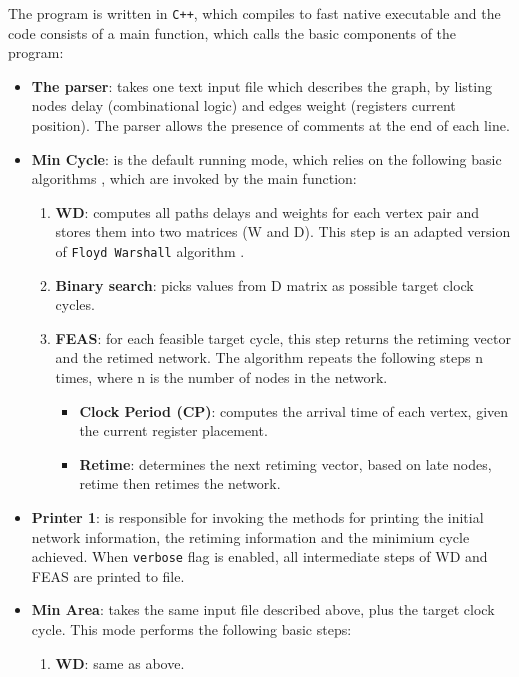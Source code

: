 \documentclass{acm_proc_article-sp}
\begin{document}
The program is written in \texttt{C++}, which compiles to fast native executable
and the code consists of a main function, which calls the basic components of
the program:
\begin{itemize}
  \item {\bf The parser}: takes  one text input file which describes the graph,
    by listing nodes delay (combinational logic) and edges weight (registers
    current position). The parser allows the presence of comments at the end of
    each line.
  \item {\bf Min Cycle}: is the default running mode, which relies on the
    following basic algorithms \cite{retime}, which are invoked by the main function:
    \begin{enumerate}
      \item {\bf WD}: computes all paths delays and weights for each vertex pair
        and stores them into two matrices (W and D). This step is an adapted
        version of \texttt{Floyd Warshall} algorithm \cite{algo}.
      \item {\bf Binary search}: picks values from D matrix as possible target
        clock cycles.
      \item {\bf FEAS}: for each feasible target cycle, this step returns the
        retiming vector and the retimed network. The algorithm repeats the
        following steps n times, where n is the number of nodes in the network.
        \begin {itemize}
          \item {\bf Clock Period (CP)}: computes the arrival time of each vertex, given
            the current register placement.
          \item {\bf Retime}: determines the next retiming vector, based on late
            nodes, retime then retimes the network.
        \end{itemize}
    \end{enumerate}
  \item {\bf Printer 1}: is responsible for invoking the methods for printing
    the initial network information, the retiming information and the minimium
    cycle achieved. When \texttt{verbose} flag is enabled, all intermediate steps
    of WD and FEAS are printed to file.
  \item {\bf Min Area}: takes the same input file described above, plus the
    target clock cycle. This mode performs the following basic steps:
    \begin{enumerate}
      \item {\bf WD}: same as above.

\end{enumerate}
\end{itemize}
\end{document}
